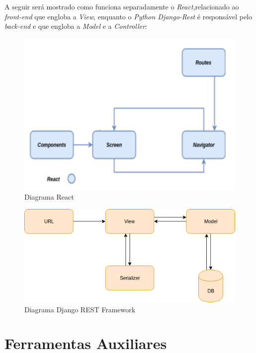 A seguir será mostrado como funciona separadamente o \textit{React},relacionado ao \textit{front-end} que engloba a \textit{View}, enquanto o \textit{Python Django-Rest} é responsável pelo \textit{back-end} e que engloba a \textit{Model} e a \textit{Controller}:

\begin{figure}[H]
	\centering
	\includegraphics[width=1.0\textwidth]{figuras/diagrama_react.png}
	\caption{Diagrama React}
	\label{img:diagrama_react}
\end{figure}

\begin{figure}[H]
	\centering
	\includegraphics[width=1.0\textwidth]{figuras/django_rest.png}
	\caption{Diagrama Django REST Framework}
	\label{img:diagrama_rest}
\end{figure}

\section{Ferramentas Auxiliares}

